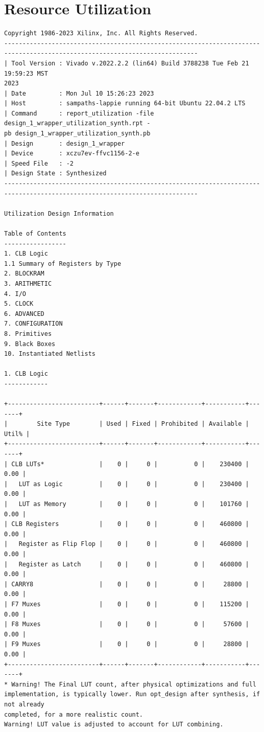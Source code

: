 \documentclass{article}
\begin{document}
\vspace{1cm}
\section{Resource Utilization}
\begin{lstlisting}
Copyright 1986-2023 Xilinx, Inc. All Rights Reserved.
---------------------------------------------------------------------------------------------------------------------------
| Tool Version : Vivado v.2022.2.2 (lin64) Build 3788238 Tue Feb 21 19:59:23 MST 
2023
| Date         : Mon Jul 10 15:26:23 2023
| Host         : sampaths-lappie running 64-bit Ubuntu 22.04.2 LTS
| Command      : report_utilization -file design_1_wrapper_utilization_synth.rpt -
pb design_1_wrapper_utilization_synth.pb
| Design       : design_1_wrapper
| Device       : xczu7ev-ffvc1156-2-e
| Speed File   : -2
| Design State : Synthesized
---------------------------------------------------------------------------------------------------------------------------

Utilization Design Information

Table of Contents
-----------------
1. CLB Logic
1.1 Summary of Registers by Type
2. BLOCKRAM
3. ARITHMETIC
4. I/O
5. CLOCK
6. ADVANCED
7. CONFIGURATION
8. Primitives
9. Black Boxes
10. Instantiated Netlists

1. CLB Logic
------------

+-------------------------+------+-------+------------+-----------+-------+
|        Site Type        | Used | Fixed | Prohibited | Available | Util% |
+-------------------------+------+-------+------------+-----------+-------+
| CLB LUTs*               |    0 |     0 |          0 |    230400 |  0.00 |
|   LUT as Logic          |    0 |     0 |          0 |    230400 |  0.00 |
|   LUT as Memory         |    0 |     0 |          0 |    101760 |  0.00 |
| CLB Registers           |    0 |     0 |          0 |    460800 |  0.00 |
|   Register as Flip Flop |    0 |     0 |          0 |    460800 |  0.00 |
|   Register as Latch     |    0 |     0 |          0 |    460800 |  0.00 |
| CARRY8                  |    0 |     0 |          0 |     28800 |  0.00 |
| F7 Muxes                |    0 |     0 |          0 |    115200 |  0.00 |
| F8 Muxes                |    0 |     0 |          0 |     57600 |  0.00 |
| F9 Muxes                |    0 |     0 |          0 |     28800 |  0.00 |
+-------------------------+------+-------+------------+-----------+-------+
* Warning! The Final LUT count, after physical optimizations and full 
implementation, is typically lower. Run opt_design after synthesis, if not already 
completed, for a more realistic count.
Warning! LUT value is adjusted to account for LUT combining.



\end{lstlisting}
\end{document}
